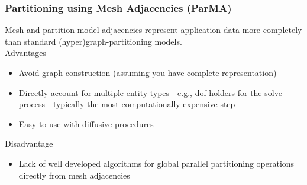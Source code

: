 \documentclass{beamer}
\begin{document}
\begin{frame}
  \frametitle{Partitioning using Mesh Adjacencies (ParMA)}
  Mesh and partition model adjacencies represent application data more
  completely than standard (hyper)graph-partitioning models.\\
  \medskip
  Advantages
  \begin{itemize}
    \item Avoid graph construction (assuming you have complete representation)
    \item Directly account for multiple entity types - e.g., dof holders for the solve
      process - typically the most computationally expensive step
    \item Easy to use with diffusive procedures
  \end{itemize}
  Disadvantage
  \begin{itemize}
    \item Lack of well developed algorithms for global parallel
      partitioning operations directly from mesh adjacencies
  \end{itemize}
\end{frame}
\end{document}
